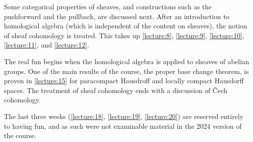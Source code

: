 Some categorical properties of sheaves, and constructions such as the pushforward and the pullback, are discussed next. After an introduction to homological algebra (which is independent of the content on sheaves), the notion of sheaf cohomology is treated. This takes up \cref{lecture:8}, \cref{lecture:9}, \cref{lecture:10}, \cref{lecture:11}, and \cref{lecture:12}. 

The real fun begins when the homological algebra is applied to sheaves of abelian groups. One of the main results of the course, the proper base change theorem, is proven in \cref{lecture:15} for paracompact Hausdroff and locally compact Hausdorff spaces. The treatment of sheaf cohomology ends with a discussion of Čech cohomology. 

The last three weeks (\cref{lecture:18}, \cref{lecture:19}, \cref{lecture:20}) are reserved entirely to having fun, and as such were not examinable material in the 2024 version of the course.  


